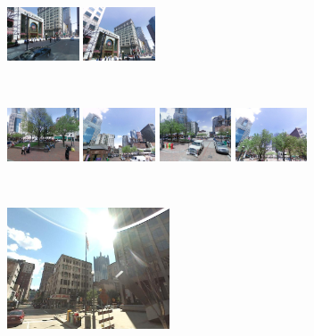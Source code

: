 \documentclass[table]{article} %
\begin{document}
\begin{figure}[t!]
\begin{minipage}{0.75\linewidth}
\begin{minipage}{\linewidth}
                \colorbox{myGreen}{\includegraphics[height=16mm]{imgs/ex2/FVsvm3}}
                \colorbox{myGreen}{\includegraphics[height=16mm]{imgs/ex2/FVsvm4}}
            \end{minipage}
            \\
            \begin{minipage}{\linewidth}
                \colorbox{myRed}{\includegraphics[height=16mm]{imgs/ex2/FV1}}
                \colorbox{myRed}{\includegraphics[height=16mm]{imgs/ex2/FV2}}
                \colorbox{myRed}{\includegraphics[height=16mm]{imgs/ex2/FV3}}
                \colorbox{myRed}{\includegraphics[height=16mm]{imgs/ex2/FV4}}
            \end{minipage} 
        \end{minipage}
        \vspace{3mm}
        \\
        \begin{minipage}{0.34\linewidth}
            \centering
            \vspace{0mm}
            \includegraphics[height=36mm]{imgs/ex3/query}

\end{minipage}
\end{figure}
\end{document}
